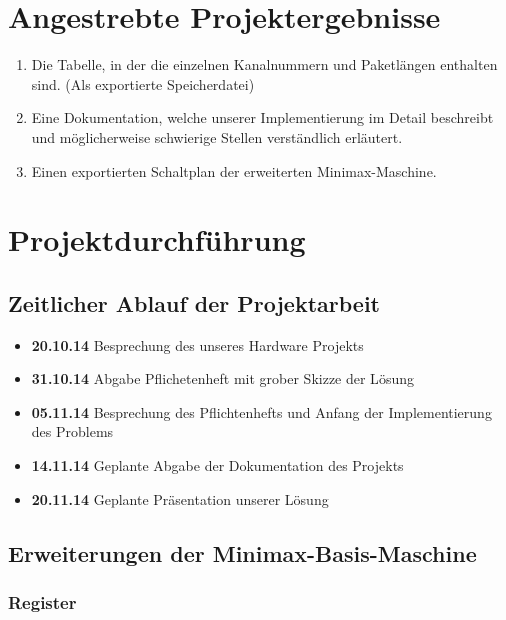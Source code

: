 \documentclass[12pt,titlepage]{article}
\begin{document}
\section{Angestrebte Projektergebnisse}
\begin{enumerate}
\item Die Tabelle, in der die einzelnen Kanalnummern und Paketl{\"a}ngen enthalten sind. (Als exportierte Speicherdatei)
\item Eine Dokumentation, welche unserer Implementierung im Detail beschreibt und m{\"o}glicherweise schwierige Stellen verst{\"a}ndlich erl{\"a}utert.
\item Einen exportierten Schaltplan der erweiterten Minimax-Maschine.
\end{enumerate}

\section{Projektdurchf{\"u}hrung}

\subsection{Zeitlicher Ablauf der Projektarbeit}

\begin{itemize}
\item [] \textbf{20.10.14} Besprechung des unseres Hardware Projekts
\item [] \textbf{31.10.14} Abgabe Pflichetenheft mit grober Skizze der L{\"o}sung
\item [] \textbf{05.11.14} Besprechung des Pflichtenhefts und Anfang der Implementierung des Problems
\item [] \textbf{14.11.14} Geplante Abgabe der Dokumentation des Projekts
\item [] \textbf{20.11.14} Geplante Pr{\"a}sentation unserer Lösung
\end{itemize}

\subsection{Erweiterungen der Minimax-Basis-Maschine}

\subsubsection{Register}
\end{document}
